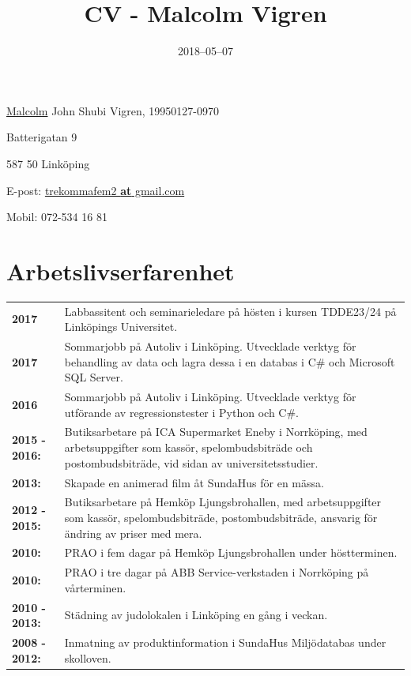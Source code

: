 \documentclass[a4paper,notitlepage]{article}
\title{
\huge{CV - Malcolm Vigren}\vspace{-3ex}}
\date{2018--05--07}
\begin{document}
	\maketitle
\underline{Malcolm} John Shubi Vigren, 19950127-0970

Batterigatan 9

587 50 Linköping

E-post: \underline{trekommafem2 \textbf{at} gmail.com}

Mobil: 072-534 16 81

\section*{Arbetslivserfarenhet}
\noindent\begin{tabular}{@{}l p{13cm}}

\textbf{2017} & Labbassitent och seminarieledare på hösten i kursen TDDE23/24 på Linköpings
    Universitet. \\

\textbf{2017} & Sommarjobb på Autoliv i Linköping. Utvecklade verktyg 
    för behandling av data och lagra dessa i en databas i C\# och Microsoft SQL Server. \\

\textbf{2016} & Sommarjobb på Autoliv i Linköping. Utvecklade verktyg för
    utförande av regressionstester i Python och C\#.\\

\textbf{2015 - 2016:} & Butiksarbetare på ICA Supermarket Eneby i Norrköping, med
arbetsuppgifter som kassör, spelombudsbiträde och postombudsbiträde, vid sidan
av universitetsstudier. \\

\textbf{2013:} & Skapade en animerad film åt SundaHus för en mässa.
\\

\textbf{2012 - 2015:} & Butiksarbetare på Hemköp Ljungsbrohallen,
med arbetsuppgifter
som kassör,
spelombudsbiträde, postombudsbiträde, ansvarig för ändring av priser med mera.
\\

\textbf{2010:} & PRAO i fem dagar på Hemköp Ljungsbrohallen under
höstterminen. \\

\textbf{2010:} & PRAO i tre dagar på ABB Service-verkstaden i
Norrköping på vårterminen. \\

\textbf{2010 - 2013:} & Städning av judolokalen i Linköping en gång
i veckan. \\

\textbf{2008 - 2012:} & Inmatning av produktinformation i SundaHus Miljödatabas under
skolloven.	\\

	\end{tabular}
\end{document}
